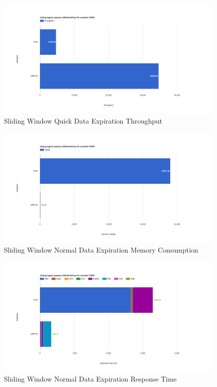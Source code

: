 \begin{figure}[!htbp]
	\centering
    \includegraphics[width=6.5in]{img/app3-slide-quick-t.png}
    \caption{Sliding Window Quick Data Expiration Throughput}
\end{figure}
\begin{figure}[!htbp]
	\centering
    \includegraphics[width=6.5in]{img/app3-slide-normal-m.png}
    \caption{Sliding Window Normal Data Expiration Memory Consumption}
\end{figure}
\begin{figure}[!htbp]
	\centering
    \includegraphics[width=6.5in]{img/app3-slide-normal-r.png}
    \caption{Sliding Window Normal Data Expiration Response Time}
\end{figure}
